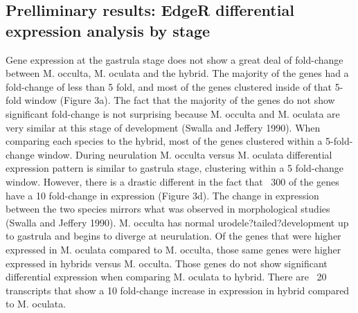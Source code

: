\subsection{Prelliminary results: EdgeR differential expression analysis by stage} 

Gene expression at the gastrula stage does not show a great deal of fold-change between M. occulta, M. oculata and the hybrid. The majority of the genes had a fold-change of less than 5 fold, and most of the genes clustered inside of that 5-fold window (Figure 3a).  The fact that the majority of the genes do not show significant fold-change is not surprising because M. occulta and M. oculata are very similar at this stage of development (Swalla and Jeffery 1990).  When comparing each species to the hybrid, most of the genes clustered within a 5-fold-change window. 
During neurulation M. occulta versus M. oculata differential expression pattern is similar to gastrula stage, clustering within a 5 fold-change window. However, there is a drastic different in the fact that ~300 of the genes have a 10 fold-change in expression (Figure 3d).  The change in expression between the two species mirrors what was observed in morphological studies (Swalla and Jeffery 1990). M. occulta has normal urodele?tailed?development up to gastrula and begins to diverge at neurulation. Of the genes that were higher expressed in M. oculata compared to M. occulta, those same genes were higher expressed in hybrids versus M. occulta. Those genes do not show significant differential expression when comparing M. oculata to hybrid. There are ~20 transcripts that show a 10 fold-change increase in expression in hybrid compared to M. oculata.
